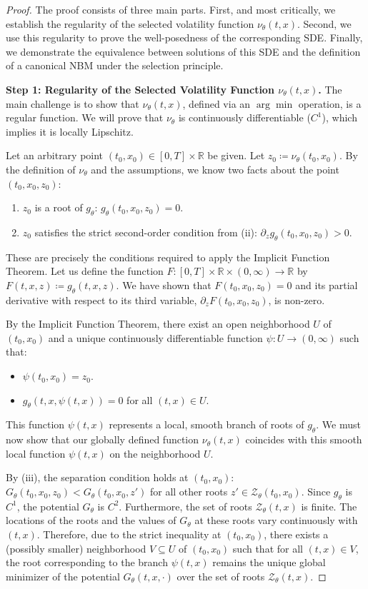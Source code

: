 \documentclass[qian]{imsart}
\newcommand{\R}{\mathbb{R}}
\theoremstyle{plain}
\theoremstyle{definition}
\begin{document}
\begin{proof}
The proof consists of three main parts. First, and most critically, we establish the regularity of the selected volatility function $\nu_\theta(t,x)$. Second, we use this regularity to prove the well-posedness of the corresponding SDE. Finally, we demonstrate the equivalence between solutions of this SDE and the definition of a canonical NBM under the selection principle.

\textbf{Step 1: Regularity of the Selected Volatility Function $\nu_\theta(t,x)$.}
The main challenge is to show that $\nu_\theta(t,x)$, defined via an $\arg\min$ operation, is a regular function. We will prove that $\nu_\theta$ is continuously differentiable ($C^1$), which implies it is locally Lipschitz.

Let an arbitrary point $(t_0, x_0) \in [0,T] \times \R$ be given. Let $z_0 \coloneqq \nu_\theta(t_0, x_0)$. By the definition of $\nu_\theta$ and the assumptions, we know two facts about the point $(t_0, x_0, z_0)$:
\begin{enumerate}
    \item $z_0$ is a root of $g_\theta$: $g_\theta(t_0, x_0, z_0) = 0$.
    \item $z_0$ satisfies the strict second-order condition from (ii): $\partial_z g_\theta(t_0, x_0, z_0) > 0$.
\end{enumerate}
These are precisely the conditions required to apply the Implicit Function Theorem. Let us define the function $F: [0,T] \times \R \times (0,\infty) \to \R$ by $F(t,x,z) \coloneqq g_\theta(t,x,z)$. We have shown that $F(t_0, x_0, z_0) = 0$ and its partial derivative with respect to its third variable, $\partial_z F(t_0, x_0, z_0)$, is non-zero.

By the Implicit Function Theorem, there exist an open neighborhood $U$ of $(t_0, x_0)$ and a unique continuously differentiable function $\psi: U \to (0,\infty)$ such that:
\begin{itemize}
    \item $\psi(t_0, x_0) = z_0$.
    \item $g_\theta(t, x, \psi(t,x)) = 0$ for all $(t,x) \in U$.
\end{itemize}
This function $\psi(t,x)$ represents a local, smooth branch of roots of $g_\theta$. We must now show that our globally defined function $\nu_\theta(t,x)$ coincides with this smooth local function $\psi(t,x)$ on the neighborhood $U$.

By (iii), the separation condition holds at $(t_0, x_0)$: $G_\theta(t_0, x_0, z_0) < G_\theta(t_0, x_0, z')$ for all other roots $z' \in \mathcal{Z}_\theta(t_0, x_0)$. Since $g_\theta$ is $C^1$, the potential $G_\theta$ is $C^2$. Furthermore, the set of roots $\mathcal{Z}_\theta(t,x)$ is finite. The locations of the roots and the values of $G_\theta$ at these roots vary continuously with $(t,x)$. Therefore, due to the strict inequality at $(t_0, x_0)$, there exists a (possibly smaller) neighborhood $V \subseteq U$ of $(t_0, x_0)$ such that for all $(t,x) \in V$, the root corresponding to the branch $\psi(t,x)$ remains the unique global minimizer of the potential $G_\theta(t,x, \cdot)$ over the set of roots $\mathcal{Z}_\theta(t,x)$.


\end{proof}
\end{document}

